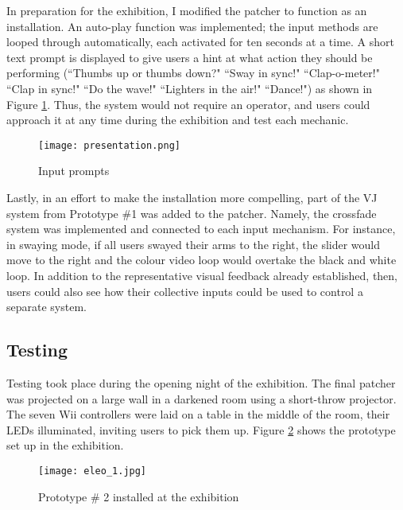 In preparation for the exhibition, I modified the patcher to function as an installation. An auto-play function was implemented; the input methods are looped through automatically, each activated for ten seconds at a time. A short text prompt is displayed to give users a hint at what action they should be performing (``Thumbs up or thumbs down?" ``Sway in sync!" ``Clap-o-meter!" ``Clap in sync!" ``Do the wave!" ``Lighters in the air!" ``Dance!") as shown in Figure \ref{prototyping2.3}. Thus, the system would not require an operator, and users could approach it at any time during the exhibition and test each mechanic.

\begin{figure}[t]
	\centering

	\texttt{[image: presentation.png]}
	\caption{Input prompts}

	\label{prototyping2.3}
\end{figure}

Lastly, in an effort to make the installation more compelling, part of the VJ system from Prototype \#1 was added to the patcher. Namely, the crossfade system was implemented and connected to each input mechanism. For instance, in swaying mode, if all users swayed their arms to the right, the slider would move to the right and the colour video loop would overtake the black and white loop. In addition to the representative visual feedback already established, then, users could also see how their collective inputs could be used to control a separate system.

\subsection{Testing}

Testing took place during the opening night of the exhibition. The final patcher was projected on a large wall in a darkened room using a short-throw projector. The seven Wii controllers were laid on a table in the middle of the room, their LEDs illuminated, inviting users to pick them up. Figure \ref{prototyping2.4} shows the prototype set up in the exhibition.

\begin{figure}[t]
	\centering

	\texttt{[image: eleo\_1.jpg]}
	\caption{Prototype \# 2 installed at the exhibition}

	\label{prototyping2.4}
\end{figure}

